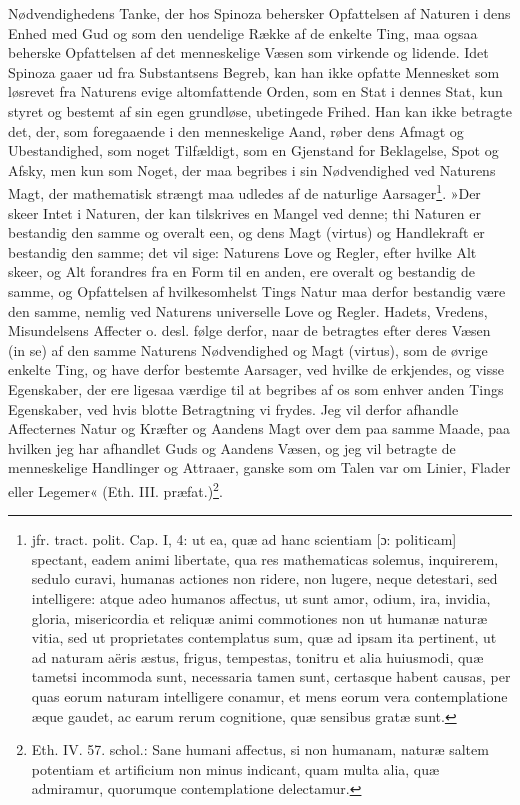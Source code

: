 \documentclass[12pt,a4paper]{book}
\newcommand{\opage}[1]{\marginnote{\footnotesize\textit{[#1]}}}
\begin{document}
Nødvendighedens Tanke, der hos Spinoza behersker
Opfattelsen af Naturen i dens Enhed med Gud og som den
uendelige Række af de enkelte Ting, maa ogsaa beherske
\opage{109} \setcounter{footnote}{0}%
Opfattelsen af det menneskelige Væsen som virkende og
lidende. Idet Spinoza gaaer ud fra Substantsens Begreb,
kan han ikke opfatte Mennesket som løsrevet fra Naturens
evige altomfattende Orden, som en Stat i dennes Stat, kun
styret og bestemt af sin egen grundløse, ubetingede Frihed.
Han kan ikke betragte det, der, som foregaaende i den
menneskelige Aand, røber dens Afmagt og Ubestandighed,
som noget Tilfældigt, som en Gjenstand for Beklagelse,
Spot og Afsky, men kun som Noget, der maa begribes i
sin Nødvendighed ved Naturens Magt, der mathematisk
strængt maa udledes af de naturlige
Aarsager\footnote{jfr. tract. polit. Cap. I, 4: ut ea, quæ ad
hanc scientiam [ɔ: politicam] spectant, eadem animi libertate,
qua res mathematicas solemus, inquirerem, sedulo curavi,
humanas actiones non ridere, non lugere, neque detestari, sed
intelligere: atque adeo humanos affectus, ut sunt amor, odium,
ira, invidia, gloria, misericordia et reliquæ animi
commotiones non ut humanæ naturæ vitia, sed ut proprietates
contemplatus sum, quæ ad ipsam ita pertinent, ut ad naturam
aëris æstus, frigus, tempestas, tonitru et alia huiusmodi, quæ
tametsi incommoda sunt, necessaria tamen sunt, certasque
habent causas, per quas eorum naturam intelligere conamur, et
mens eorum vera contemplatione æque gaudet, ac earum rerum
cognitione, quæ sensibus gratæ sunt.}. »Der skeer
Intet i Naturen, der kan tilskrives en Mangel ved denne;
thi Naturen er bestandig den samme og overalt een, og
dens Magt (virtus) og Handlekraft er bestandig den samme;
det vil sige: Naturens Love og Regler, efter hvilke Alt
skeer, og Alt forandres fra en Form til en anden, ere overalt
og bestandig de samme, og Opfattelsen af hvilkesomhelst
Tings Natur maa derfor bestandig være den samme, nemlig
ved Naturens universelle Love og Regler. Hadets, Vredens,
Misundelsens Affecter o. desl. følge derfor, naar de betragtes
efter deres Væsen (in se) af den samme Naturens
Nødvendighed og Magt (virtus), som de øvrige enkelte Ting,
og have derfor bestemte Aarsager, ved hvilke de erkjendes,
og visse Egenskaber, der ere ligesaa værdige til at begribes
af os som enhver anden Tings Egenskaber, ved hvis blotte
Betragtning vi frydes. Jeg vil derfor afhandle Affecternes
\opage{110} \setcounter{footnote}{0}%
Natur og Kræfter og Aandens Magt over dem paa samme
Maade, paa hvilken jeg har afhandlet Guds og Aandens
Væsen, og jeg vil betragte de menneskelige Handlinger og
Attraaer, ganske som om Talen var om Linier, Flader eller
Legemer« (Eth. III. præfat.)\footnote{Eth. IV. 57. schol.: Sane
humani affectus, si non humanam, naturæ saltem potentiam et
artificium non minus indicant, quam multa alia, quæ
admiramur, quorumque contemplatione delectamur.}.
\end{document}
